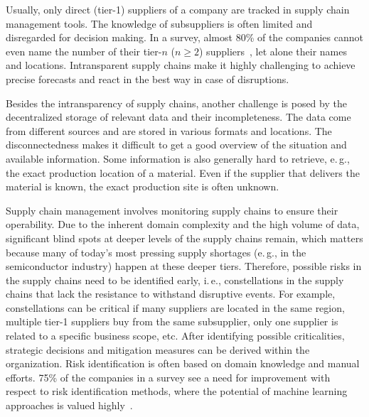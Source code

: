 \documentclass[
]{ceurart}
\begin{document}
Usually, only direct (tier-1) suppliers of a company are tracked in supply chain management tools. The knowledge of subsuppliers is often limited and disregarded for decision making.  In a survey, almost 80\% of the companies cannot even name the number of their tier-$n$ ($n\geq 2$) suppliers~\cite{brylowski2021studie}, let alone their names and locations. 
Intransparent supply chains make it highly challenging to achieve precise forecasts and react in the best way in case of disruptions.

Besides the intransparency of supply chains, another challenge is posed by the decentralized storage of relevant data and their incompleteness. The data come from different sources and are stored in various formats and locations. The disconnectedness makes it difficult to get a good overview of the situation and available information. Some information is also generally hard to retrieve, e.\,g., the exact production location of a material. Even if the supplier that delivers the material is known, the exact production site is often unknown.

Supply chain management involves monitoring supply chains to ensure their operability. Due to the inherent domain complexity and the high volume of data, significant blind spots at deeper levels of the supply chains remain, which matters because many of today’s most pressing supply shortages (e.\,g., in the semiconductor industry) happen at these deeper tiers. Therefore, possible risks in the supply chains need to be identified early, i.\,e., constellations in the supply chains that lack the resistance to withstand disruptive events. 
For example, constellations can be critical if many suppliers are located in the same region, multiple tier-1 suppliers buy from the same subsupplier, only one supplier is related to a specific business scope, etc. After identifying possible criticalities, strategic decisions and mitigation measures can be derived within the organization.
Risk identification is often based on domain knowledge and manual efforts. 75\% of the companies in a survey see a need for improvement with respect to risk identification methods, where the potential of machine learning approaches is valued highly~\cite{brylowski2021studie}.
\end{document}
